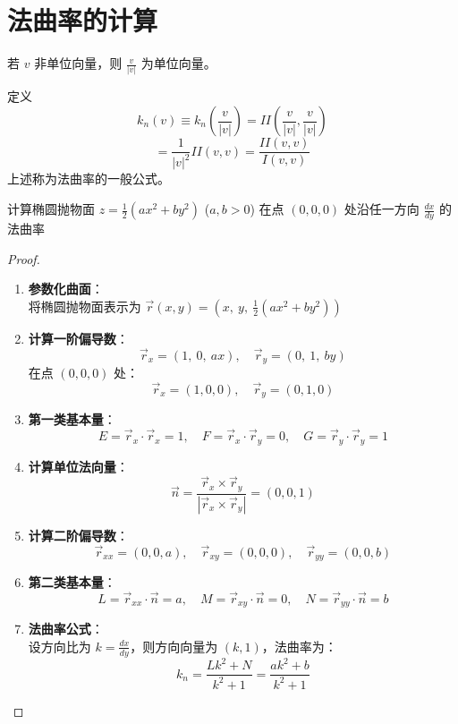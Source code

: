 \documentclass[lang=cn,10pt,thmcnt=section]{elegantbook}
\begin{document}
\section{法曲率的计算}
\begin{proposition}[法曲率的一般公式]


	若 $v$ 非单位向量，则 $\frac{v}{|v|}$ 为单位向量。
	
	定义
	\[
	k_n(v) \equiv k_n\left(\frac{v}{|v|}\right) = II\left(\frac{v}{|v|}, \frac{v}{|v|}\right)
	\]
	\[
	= \frac{1}{|v|^2} II(v,v) = \frac{II(v,v)}{I(v,v)}
	\]
	上述称为法曲率的一般公式。
\end{proposition}
\begin{example}
	计算椭圆抛物面 $z = \frac{1}{2}(ax^2 + by^2)$ ($a, b > 0$) 在点 $(0,0,0)$ 处沿任一方向 $\frac{dx}{dy}$ 的法曲率
\end{example}
\begin{proof}
	
	\begin{enumerate}
		\item \textbf{参数化曲面}：\\
		将椭圆抛物面表示为 $\vec{r}(x,y) = \left(x,\ y,\ \frac{1}{2}(ax^2 + by^2)\right)$
		
		\item \textbf{计算一阶偏导数}：
		\[
			\vec{r}_x = \left(1,\ 0,\ ax\right), \quad 
			\vec{r}_y = \left(0,\ 1,\ by\right)
		\]
		在点 $(0,0,0)$ 处：
		\[
			\vec{r}_x = (1,0,0), \quad 
			\vec{r}_y = (0,1,0)
		\]
		
		\item \textbf{第一类基本量}：
		\[
			E = \vec{r}_x \cdot \vec{r}_x = 1, \quad 
			F = \vec{r}_x \cdot \vec{r}_y = 0, \quad 
			G = \vec{r}_y \cdot \vec{r}_y = 1
		\]
		
		\item \textbf{计算单位法向量}：
		\[
			\vec{n} = \frac{\vec{r}_x \times \vec{r}_y}{|\vec{r}_x \times \vec{r}_y|} = (0,0,1)
		\]
		
		\item \textbf{计算二阶偏导数}：
		\[
			\vec{r}_{xx} = (0,0,a), \quad 
			\vec{r}_{xy} = (0,0,0), \quad 
			\vec{r}_{yy} = (0,0,b)
		\]
		
		\item \textbf{第二类基本量}：
		\[
			L = \vec{r}_{xx} \cdot \vec{n} = a, \quad 
			M = \vec{r}_{xy} \cdot \vec{n} = 0, \quad 
			N = \vec{r}_{yy} \cdot \vec{n} = b
		\]
		
		\item \textbf{法曲率公式}：\\
		设方向比为 $k = \frac{dx}{dy}$，则方向向量为 $(k, 1)$，法曲率为：
		\[
			k_n = \frac{Lk^2 + N}{k^2 + 1} = \frac{a k^2 + b}{k^2 + 1}
		\]
	\end{enumerate}
	
\end{proof}
\end{document}
